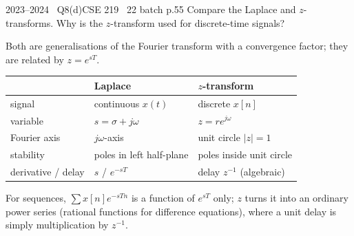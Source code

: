 \begin{qcard}{2023--2024 \textbullet\ Q8(d)}{CSE 219 \textbullet\ 22 batch p.5}{5}
Compare the Laplace and $z$-transforms. Why is the $z$-transform used for discrete-time signals?
\end{qcard}
\begin{solution}
Both are generalisations of the Fourier transform with a convergence factor; they are related by $z=e^{sT}$.
\begin{center}\small\renewcommand{\arraystretch}{1.2}\begin{tabular}{@{}lll@{}}\toprule&Laplace&$z$-transform\\\midrule signal&continuous $x(t)$&discrete $x[n]$\\ variable&$s=\sigma+j\omega$&$z=re^{j\omega}$\\ Fourier axis&$j\omega$-axis&unit circle $|z|=1$\\ stability&poles in left half-plane&poles inside unit circle\\ derivative / delay&$s$ / $e^{-sT}$&delay $z^{-1}$ (algebraic)\\\bottomrule\end{tabular}\end{center}
For sequences, $\sum x[n]e^{-sTn}$ is a function of $e^{sT}$ only; $z$ turns it into an ordinary power series (rational functions for difference equations), where a unit delay is simply multiplication by $z^{-1}$.
\end{solution}

